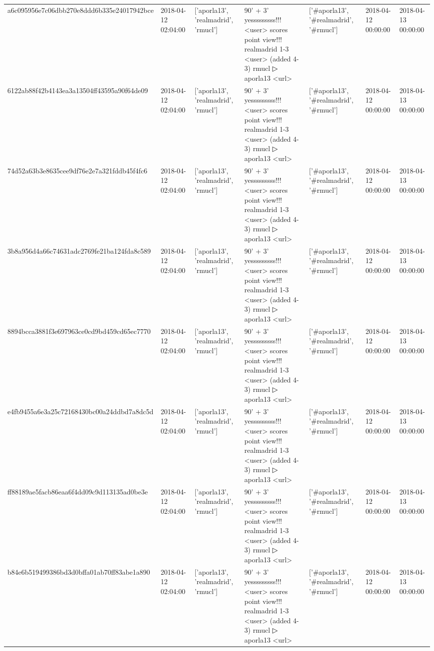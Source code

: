 \begin{tabular}{lllllll}
a6c095956e7c06dbb270e8ddd6b335e24017942bce & 2018-04-12 02:04:00 & ['aporla13', 'realmadrid', 'rmucl'] & 90' + 3' yesssssssss!!! <user> scores point view!!! realmadrid 1-3 <user> (added 4-3) rmucl ▷ aporla13 <url> & ['#aporla13', '#realmadrid', '#rmucl'] & 2018-04-12 00:00:00 & 2018-04-13 00:00:00 \\
6122ab88f42b4143ea3a13504ff43595a90f64de09 & 2018-04-12 02:04:00 & ['aporla13', 'realmadrid', 'rmucl'] & 90' + 3' yesssssssss!!! <user> scores point view!!! realmadrid 1-3 <user> (added 4-3) rmucl ▷ aporla13 <url> & ['#aporla13', '#realmadrid', '#rmucl'] & 2018-04-12 00:00:00 & 2018-04-13 00:00:00 \\
74d52a63b3e8635cee9df76e2e7a321fddb45f4fc6 & 2018-04-12 02:04:00 & ['aporla13', 'realmadrid', 'rmucl'] & 90' + 3' yesssssssss!!! <user> scores point view!!! realmadrid 1-3 <user> (added 4-3) rmucl ▷ aporla13 <url> & ['#aporla13', '#realmadrid', '#rmucl'] & 2018-04-12 00:00:00 & 2018-04-13 00:00:00 \\
3b8a956d4a66c74631adc2769fe21ba124fda8c589 & 2018-04-12 02:04:00 & ['aporla13', 'realmadrid', 'rmucl'] & 90' + 3' yesssssssss!!! <user> scores point view!!! realmadrid 1-3 <user> (added 4-3) rmucl ▷ aporla13 <url> & ['#aporla13', '#realmadrid', '#rmucl'] & 2018-04-12 00:00:00 & 2018-04-13 00:00:00 \\
8894bcca3881f3e697963ce0cd9bd459cd65ec7770 & 2018-04-12 02:04:00 & ['aporla13', 'realmadrid', 'rmucl'] & 90' + 3' yesssssssss!!! <user> scores point view!!! realmadrid 1-3 <user> (added 4-3) rmucl ▷ aporla13 <url> & ['#aporla13', '#realmadrid', '#rmucl'] & 2018-04-12 00:00:00 & 2018-04-13 00:00:00 \\
e4fb9455a6e3a25c72168430bc00a24ddbd7a8dc5d & 2018-04-12 02:04:00 & ['aporla13', 'realmadrid', 'rmucl'] & 90' + 3' yesssssssss!!! <user> scores point view!!! realmadrid 1-3 <user> (added 4-3) rmucl ▷ aporla13 <url> & ['#aporla13', '#realmadrid', '#rmucl'] & 2018-04-12 00:00:00 & 2018-04-13 00:00:00 \\
ff88189ae5facb86eaa6f4dd09c9d113135ad0be3e & 2018-04-12 02:04:00 & ['aporla13', 'realmadrid', 'rmucl'] & 90' + 3' yesssssssss!!! <user> scores point view!!! realmadrid 1-3 <user> (added 4-3) rmucl ▷ aporla13 <url> & ['#aporla13', '#realmadrid', '#rmucl'] & 2018-04-12 00:00:00 & 2018-04-13 00:00:00 \\
b84e6b519499386bd3d0bffa01ab70ff83abe1a890 & 2018-04-12 02:04:00 & ['aporla13', 'realmadrid', 'rmucl'] & 90' + 3' yesssssssss!!! <user> scores point view!!! realmadrid 1-3 <user> (added 4-3) rmucl ▷ aporla13 <url> & ['#aporla13', '#realmadrid', '#rmucl'] & 2018-04-12 00:00:00 & 2018-04-13 00:00:00 \\

\end{tabular}
